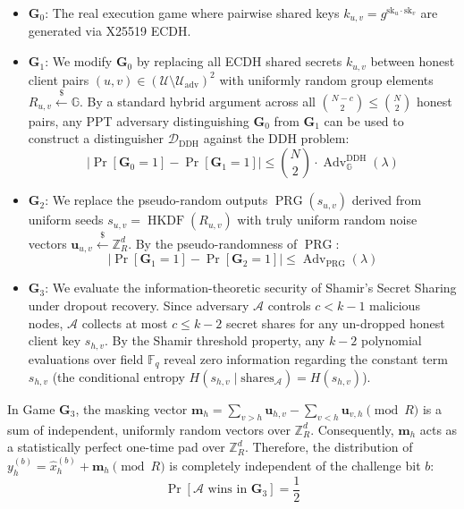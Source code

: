 \begin{itemize}
    \item $\mathbf{G}_0$: The real execution game where pairwise shared keys $k_{u,v} = g^{\text{sk}_u \cdot \text{sk}_v}$ are generated via X25519 ECDH.
    
    \item $\mathbf{G}_1$: We modify $\mathbf{G}_0$ by replacing all ECDH shared secrets $k_{u,v}$ between honest client pairs $(u, v) \in (\mathcal{U} \setminus \mathcal{U}_{\text{adv}})^2$ with uniformly random group elements $R_{u,v} \stackrel{\$}{\leftarrow} \mathbb{G}$. By a standard hybrid argument across all $\binom{N - c}{2} \le \binom{N}{2}$ honest pairs, any PPT adversary distinguishing $\mathbf{G}_0$ from $\mathbf{G}_1$ can be used to construct a distinguisher $\mathcal{D}_{\text{DDH}}$ against the DDH problem:
    \begin{equation}
        |\operatorname{Pr}[\mathbf{G}_0 = 1] - \operatorname{Pr}[\mathbf{G}_1 = 1]| \le \binom{N}{2} \cdot \operatorname{Adv}_{\mathbb{G}}^{\text{DDH}}(\lambda)
    \end{equation}
    
    \item $\mathbf{G}_2$: We replace the pseudo-random outputs $\operatorname{PRG}(s_{u,v})$ derived from uniform seeds $s_{u,v} = \operatorname{HKDF}(R_{u,v})$ with truly uniform random noise vectors $\mathbf{u}_{u,v} \stackrel{\$}{\leftarrow} \mathbb{Z}_R^d$. By the pseudo-randomness of $\operatorname{PRG}$:
    \begin{equation}
        |\operatorname{Pr}[\mathbf{G}_1 = 1] - \operatorname{Pr}[\mathbf{G}_2 = 1]| \le \operatorname{Adv}_{\operatorname{PRG}}(\lambda)
    \end{equation}
    
    \item $\mathbf{G}_3$: We evaluate the information-theoretic security of Shamir's Secret Sharing under dropout recovery. Since adversary $\mathcal{A}$ controls $c < k - 1$ malicious nodes, $\mathcal{A}$ collects at most $c \le k - 2$ secret shares for any un-dropped honest client key $s_{h,v}$. By the Shamir threshold property, any $k - 2$ polynomial evaluations over field $\mathbb{F}_q$ reveal zero information regarding the constant term $s_{h,v}$ (the conditional entropy $H(s_{h,v} \mid \text{shares}_{\mathcal{A}}) = H(s_{h,v})$).
\end{itemize}

In Game $\mathbf{G}_3$, the masking vector $\mathbf{m}_h = \sum_{v > h} \mathbf{u}_{h,v} - \sum_{v < h} \mathbf{u}_{v,h} \pmod R$ is a sum of independent, uniformly random vectors over $\mathbb{Z}_R^d$. Consequently, $\mathbf{m}_h$ acts as a statistically perfect one-time pad over $\mathbb{Z}_R^d$. Therefore, the distribution of $y_h^{(b)} = \hat{x}_h^{(b)} + \mathbf{m}_h \pmod R$ is completely independent of the challenge bit $b$:
\begin{equation}
    \operatorname{Pr}[\mathcal{A} \text{ wins in } \mathbf{G}_3] = \frac{1}{2}
\end{equation}

